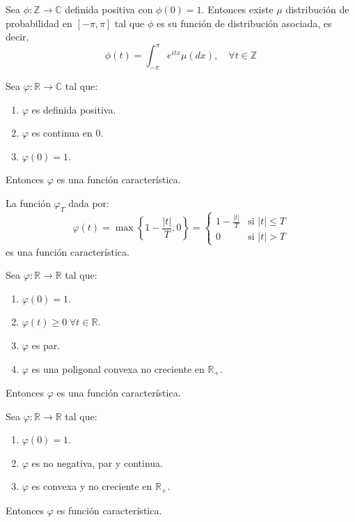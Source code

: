 \begin{lemma}[Herglotz]
    Sea $\phi: \mathbb{Z} \to \mathbb{C}$ definida positiva con $\phi(0) = 1$.
    Entonces existe $\mu$ distribución de probabilidad en $[-\pi, \pi]$ tal que $\phi$ es su función de distribución asociada, es decir,
    $$\phi(t) = \int_{-\pi}^\pi e^{itx}\mu(dx), \quad \forall t \in \mathbb{Z}$$
\end{lemma}

\begin{theorem}[Bochner]
    Sea $\varphi: \mathbb{R} \to \mathbb{C}$ tal que:
    \begin{enumerate}
        \item $\varphi$ es definida positiva.
        \item $\varphi$ es continua en 0.
        \item $\varphi(0) = 1$.
    \end{enumerate}
    Entonces $\varphi$ es una función característica.
\end{theorem}

\begin{proposition}
    La función $\varphi_T$ dada por:
    $$\varphi(t) = \max\left\{1-\frac{|t|}{T}, 0\right\} = \begin{cases}
            1 - \frac{|t|}{T} & \text{si } |t| \leq T \\
            0                 & \text{si } |t| > T
        \end{cases}$$
    es una función característica.
\end{proposition}

\begin{lemma}
    Sea $\varphi: \mathbb{R} \to \mathbb{R}$ tal que:
    \begin{enumerate}
        \item $\varphi(0) = 1$.
        \item $\varphi(t) \geq 0 \; \forall t \in \mathbb{R}$.
        \item $\varphi$ es par.
        \item $\varphi$ es una poligonal convexa no creciente en $\mathbb{R}_+$.
    \end{enumerate}
    Entonces $\varphi$ es una función característica.
\end{lemma}

\begin{theorem}
    Sea $\varphi: \mathbb{R} \to \mathbb{R}$ tal que:
    \begin{enumerate}
        \item $\varphi(0) = 1$.
        \item $\varphi$ es no negativa, par y continua.
        \item $\varphi$ es convexa y no creciente en $\mathbb{R}_+$.
    \end{enumerate}
    Entonces $\varphi$ es función característica.
\end{theorem}

